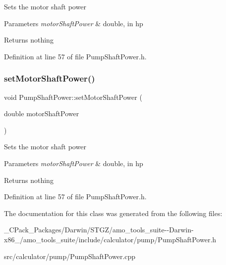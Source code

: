 Sets the motor shaft power


\begin{DoxyParams}{Parameters}
{\em motor\+Shaft\+Power} & double, in hp\\
\hline
\end{DoxyParams}
\begin{DoxyReturn}{Returns}
nothing 
\end{DoxyReturn}


Definition at line 57 of file Pump\+Shaft\+Power.\+h.

\mbox{\label{class_pump_shaft_power_a77b8c621c7c92841dbd00112437c413b}} 
\subsubsection{\texorpdfstring{set\+Motor\+Shaft\+Power()}{setMotorShaftPower()}\hspace{0.1cm}{\footnotesize\ttfamily [3/3]}}
{\footnotesize\ttfamily void Pump\+Shaft\+Power\+::set\+Motor\+Shaft\+Power (\begin{DoxyParamCaption}\item[{double}]{motor\+Shaft\+Power }\end{DoxyParamCaption})\hspace{0.3cm}{\ttfamily [inline]}}

Sets the motor shaft power


\begin{DoxyParams}{Parameters}
{\em motor\+Shaft\+Power} & double, in hp\\
\hline
\end{DoxyParams}
\begin{DoxyReturn}{Returns}
nothing 
\end{DoxyReturn}


Definition at line 57 of file Pump\+Shaft\+Power.\+h.



The documentation for this class was generated from the following files\+:\begin{DoxyCompactItemize}
\item 
\+\_\+\+C\+Pack\+\_\+\+Packages/\+Darwin/\+S\+T\+G\+Z/amo\+\_\+tools\+\_\+suite-\/-\/\+Darwin-\/x86\+\_/amo\+\_\+tools\+\_\+suite/include/calculator/pump/Pump\+Shaft\+Power.\+h\item 
src/calculator/pump/Pump\+Shaft\+Power.\+cpp\end{DoxyCompactItemize}
